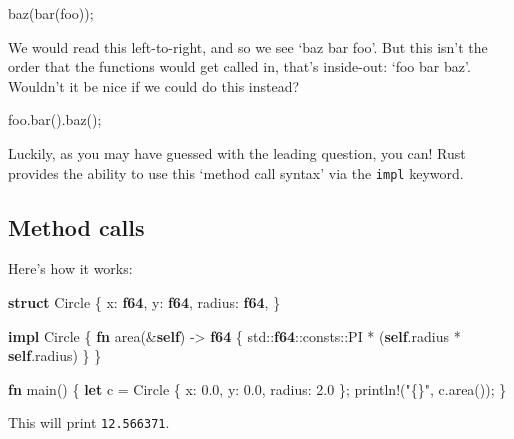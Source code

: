 \documentclass[a4paper,]{book}
\newenvironment{Shaded}{\begin{snugshade}}{\end{snugshade}}
\newcommand{\KeywordTok}[1]{\textcolor[rgb]{0.13,0.29,0.53}{\textbf{{#1}}}}
\newcommand{\DecValTok}[1]{\textcolor[rgb]{0.00,0.00,0.81}{{#1}}}
\newcommand{\StringTok}[1]{\textcolor[rgb]{0.31,0.60,0.02}{{#1}}}
\newcommand{\OtherTok}[1]{\textcolor[rgb]{0.56,0.35,0.01}{{#1}}}
\newcommand{\NormalTok}[1]{{#1}}
\begin{document}
\begin{Shaded}
\begin{Highlighting}[]
\NormalTok{baz(bar(foo));}
\end{Highlighting}
\end{Shaded}

We would read this left-to-right, and so we see `baz bar foo'. But this
isn't the order that the functions would get called in, that's
inside-out: `foo bar baz'. Wouldn't it be nice if we could do this
instead?

\begin{Shaded}
\begin{Highlighting}[]
\NormalTok{foo.bar().baz();}
\end{Highlighting}
\end{Shaded}

Luckily, as you may have guessed with the leading question, you can!
Rust provides the ability to use this `method call syntax' via the
\texttt{impl} keyword.

\subsection{Method calls}\label{method-calls}

Here's how it works:

\begin{Shaded}
\begin{Highlighting}[]
\KeywordTok{struct} \NormalTok{Circle \{}
    \NormalTok{x: }\KeywordTok{f64}\NormalTok{,}
    \NormalTok{y: }\KeywordTok{f64}\NormalTok{,}
    \NormalTok{radius: }\KeywordTok{f64}\NormalTok{,}
\NormalTok{\}}

\KeywordTok{impl} \NormalTok{Circle \{}
    \KeywordTok{fn} \NormalTok{area(&}\KeywordTok{self}\NormalTok{) -> }\KeywordTok{f64} \NormalTok{\{}
        \NormalTok{std::}\KeywordTok{f64}\NormalTok{::consts::PI * (}\KeywordTok{self}\NormalTok{.radius * }\KeywordTok{self}\NormalTok{.radius)}
    \NormalTok{\}}
\NormalTok{\}}

\KeywordTok{fn} \NormalTok{main() \{}
    \KeywordTok{let} \NormalTok{c = Circle \{ x: }\DecValTok{0.0}\NormalTok{, y: }\DecValTok{0.0}\NormalTok{, radius: }\DecValTok{2.0} \NormalTok{\};}
    \OtherTok{println!}\NormalTok{(}\StringTok{"\{\}"}\NormalTok{, c.area());}
\NormalTok{\}}
\end{Highlighting}
\end{Shaded}

This will print \texttt{12.566371}.
\end{document}
